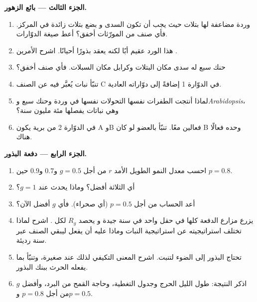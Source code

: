 \begin{problem}
\medskip
\noindent\textbf{الجزء الثالث --- بائع الزهور.}
\begin{enumerate}[resume]
  \item وردة مضاعفة لها بتلات حيث يجب أن تكون السدى و
        بضع بتلات زائدة في المركز. فأي صنف من المورّثات
        أخفق؟ أعط صيغة الدوّارات.
  \item هذا الورد عقيم أبًا  لكنه يعقد بذورًا أحيانًا.
        اشرح الأمرين .
  \item حنك سبع له سدى مكان البتلات وكرابل
        مكان السبلات. فأي صنف أخفق؟
  \item تنبّأ  نبات يُعبَّر فيه عن الصنف C
        في الدوّارة 1 إضافةً إلى دوّاراته العادية.
  \item لماذا أنتجت الطفرات نفسها التحولات نفسها
        في وردة وحنك سبع و\emph{Arabidopsis}، وهي نباتات
        يفصلها مئة مليون سنة؟
  \item في الدوّارة 2 من  برية يكون A وB فعالين معًا.
        تنبّأ بالعضو لو كان B وحده فعالًا هناك.
\end{enumerate}

\medskip
\noindent\textbf{الجزء الرابع --- دفعة البذور.}
\begin{enumerate}[resume]
  \item احسب معدل النمو الطويل الأمد $r$ من أجل $g = 0.5$ و$0.7$
        و$0.9$ حين $p = 0.8$.
  \item أي الثلاثة أفضل؟ وماذا يحدث عند $g = 1$؟
  \item أعد الحساب من أجل $p = 0.5$ (أي صحراء). فأي $g$ أفضل الآن؟
  \item يزرع مزارع الدفعة كلها في حقل واحد في سنة جيدة و
        يحصد $R_g$ لكل . اشرح لماذا تختلف استراتيجيته
        عن استراتيجية النبات وماذا عليه أن يفعل ليبقي الصنف
        عبر سنة رديئة.
  \item تحتاج البذور إلى الضوء لتنبت. اشرح المعنى
        التكيفي لذلك عند  صغيرة، وتنبّأ بما يفعله الحرث
        ببنك البذور.
  \item اذكر النتيجة: طول الليل الحرج وجدول
        التغطية، وحاجة القمح من البرد، وأفضل $g$ من أجل
        $p = 0.8$ و$p = 0.5$.
\end{enumerate}
\end{problem}
